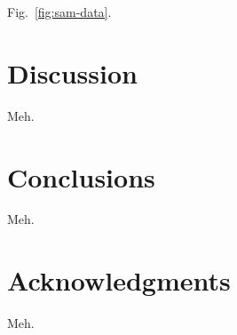 \documentclass[extra,mreferee]{gji}
\begin{document}
Fig.~\ref{fig:sam-data}.

\section{Discussion}

Meh.

\section{Conclusions}

Meh.

\section{Acknowledgments}

Meh.



\end{document}
